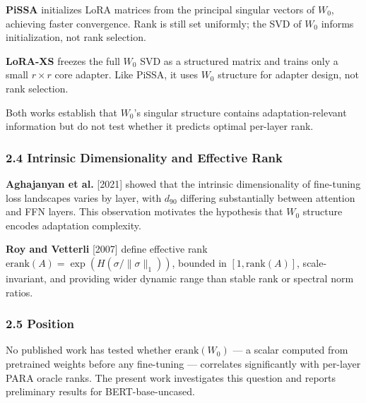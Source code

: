 \textbf{PiSSA} \citep{Meng2024PiSSA} initializes LoRA matrices from the principal singular vectors of $W_0$, achieving faster convergence. Rank is still set uniformly; the SVD of $W_0$ informs initialization, not rank selection.

\textbf{LoRA-XS} \citep{Balazy2024LoRAXS} freezes the full $W_0$ SVD as a structured matrix and trains only a small $r \times r$ core adapter. Like PiSSA, it uses $W_0$ structure for adapter design, not rank selection.

Both works establish that $W_0$'s singular structure contains adaptation-relevant information but do not test whether it predicts optimal per-layer rank.

\subsubsection{2.4 Intrinsic Dimensionality and Effective Rank}

\textbf{Aghajanyan et al.} [2021] showed that the intrinsic dimensionality of fine-tuning loss landscapes varies by layer, with $d_{90}$ differing substantially between attention and FFN layers. This observation motivates the hypothesis that $W_0$ structure encodes adaptation complexity.

\textbf{Roy and Vetterli} [2007] define effective rank $\text{erank}(A) = \exp(H(\sigma/\|\sigma\|_1))$, bounded in $[1, \text{rank}(A)]$, scale-invariant, and providing wider dynamic range than stable rank or spectral norm ratios.

\subsubsection{2.5 Position}

No published work has tested whether $\text{erank}(W_0)$ --- a scalar computed from pretrained weights before any fine-tuning --- correlates significantly with per-layer PARA oracle ranks. The present work investigates this question and reports preliminary results for BERT-base-uncased.

